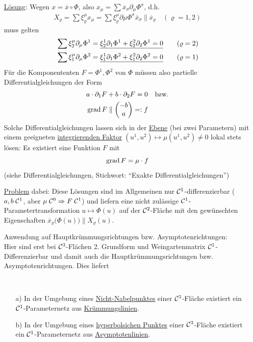 \uline{Lösung}: Wegen \(x = \overline x \circ \Phi\), also \( x_\mu = \sum \overline x_\sigma \partial_\mu \Phi^\sigma\), d.h.
\begin{align*}
 X_\varrho = \sum \xi^\mu_\varrho x_\mu = \sum \xi^\mu_\varrho \partial \mu \Phi^\sigma \overline x_\sigma \parallel \overline x_\varrho \quad (\varrho = 1,2)
\end{align*}
muss gelten
\begin{align*}
  &\sum \xi^\mu_2 \partial_\mu \Phi^1 = \uline{\xi^1_2 \partial_1 \Phi^1 + \xi^2_2 \partial_2 \Phi^1 = 0} \tag{\(\varrho = 2\)} \\
  &\sum \xi^\mu_1 \partial_\mu \Phi^2 = \uline{\xi^1_1 \partial_1 \Phi^2 + \xi^2_1 \partial_2 \Phi^2 = 0} \tag{\(\varrho = 1\)} 
\end{align*}
Für die Komponententen \(F = \Phi^1, \Phi^2\) von \(\Phi\) müssen also partielle Differentialgleichungen der Form
\begin{align*}
 &a \cdot \partial_1 F + b \cdot \partial_2 F = 0 &\text{bzw.} \\
 &\operatorname{grad} F \parallel \begin{pmatrix} -b \\ a \end{pmatrix}  =: f
\end{align*}
Solche Differentialgleichungen lassen sich in der \uline{Ebene} (bei zwei Parametern) mit einem geeigneten \uline{integrierenden Faktor} \((u^1, u^2) \mapsto \mu(u^1, u^2) \ne 0\) lokal stets lösen: Es existiert eine Funktion \(F\) mit 
\[
 \operatorname{grad} F = \mu \cdot f
\]
(siehe Differentialgleichungen, Stichwort: "`Exakte Differentialgleichungen"') \par
\uline{Problem} dabei: Diese Lösungen sind im Allgemeinen nur \(\mathcal{C}^1\)-differenzierbar (\(a,b \; \mathcal{C}^1\), aber \(\mu \; \mathcal{C}^0 \Rightarrow F \; \mathcal{C}^1\)) und liefern eine nicht zulässige \(\mathcal{C}^1\)-Parametertransformation \(u \mapsto \Phi(u)\) auf der \(\mathcal{C}^2\)-Fläche mit den gewünschten Eigenschaften \(\overline x_\varrho \big(\Phi(u)\big) \parallel X_\varrho(u)\). \par

Anwendung auf Hauptkrümmungsrichtungen bzw. Asymptotenrichtungen:\\
Hier sind erst bei \(\mathcal{C}^3\)-Flächen 2. Grundform und Weingartenmatrix \(\mathcal{C}^1\)-Differenzierbar und damit auch die Hauptkrümmungsrichtungen bzw. Asymptotenrichtungen. Dies liefert

\begin{satz}\label{satz247} \(\)
 \begin{enumerate}
  \item[a)] In der Umgebung eines \uline{Nicht-Nabelpunktes} einer \(\mathcal{C}^3\)-Fläche existiert ein \(\mathcal{C}^1\)-Parameternetz aus \uline{Krümmungslinien}.  
  \item[b)] In der Umgebung eines \uline{hyperbolsichen Punktes}  einer \(\mathcal{C}^3\)-Fläche existiert ein \(\mathcal{C}^1\)-Parameternetz aus \uline{Asymptotenlinien}.
 \end{enumerate}

\end{satz}

